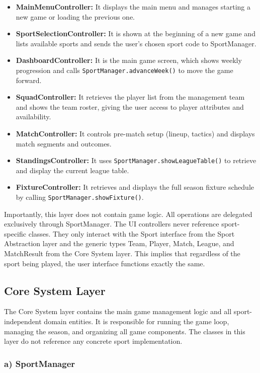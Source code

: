 \documentclass[12pt, a4paper]{article}
\begin{document}
\begin{itemize}
    \item \textbf{MainMenuController:} It displays the main menu and manages starting a new game or loading the previous one.
    \item \textbf{SportSelectionController:} It is shown at the beginning of a new game and lists available sports and sends the user's chosen sport code to SportManager.
    \item \textbf{DashboardController:} It is the main game screen, which shows weekly progression and calls \texttt{SportManager.}\allowbreak\texttt{advanceWeek()} to move the game forward.
    \item \textbf{SquadController:} It retrieves the player list from the management team and shows the team roster, giving the user access to player attributes and availability.
    \item \textbf{MatchController:} It controls pre-match setup (lineup, tactics) and displays match segments and outcomes.
    \item \textbf{StandingsController:} It uses \texttt{SportManager.}\allowbreak\texttt{showLeagueTable()} to retrieve and display the current league table.
    \item \textbf{FixtureController:} It retrieves and displays the full season fixture schedule by calling \texttt{SportManager.}\allowbreak\texttt{showFixture()}.
\end{itemize}

Importantly, this layer does not contain game logic. All operations are delegated exclusively
through SportManager. The UI controllers never reference sport-specific classes. They only
interact with the Sport interface from the Sport Abstraction layer and the generic types Team,
Player, Match, League, and MatchResult from the Core System layer. This implies that
regardless of the sport being played, the user interface functions exactly the same.

\subsection{Core System Layer}

The Core System layer contains the main game management logic and all sport-independent
domain entities. It is responsible for running the game loop, managing the season, and
organizing all game components. The classes in this layer do not reference any concrete sport
implementation.

\subsubsection*{a) SportManager}
\end{document}
